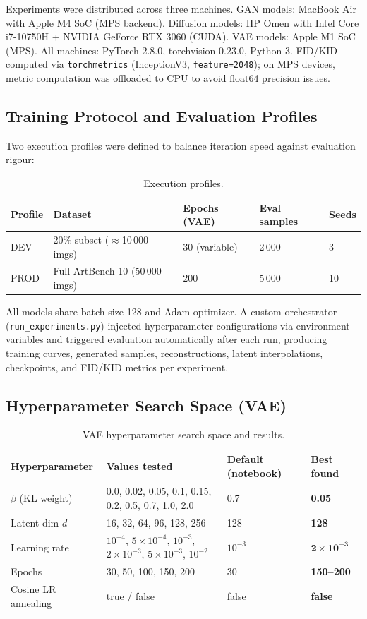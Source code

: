 \documentclass[runningheads]{llncs}
\begin{document}
Experiments were distributed across three machines. GAN models: MacBook Air with Apple M4 SoC (MPS backend). Diffusion models: HP Omen with Intel Core i7-10750H + NVIDIA GeForce RTX 3060 (CUDA). VAE models: Apple M1 SoC (MPS). All machines: PyTorch 2.8.0, torchvision 0.23.0, Python 3. FID/KID computed via \texttt{torchmetrics} (InceptionV3, \texttt{feature=2048}); on MPS devices, metric computation was offloaded to CPU to avoid float64 precision issues.

\subsection{Training Protocol and Evaluation Profiles}

Two execution profiles were defined to balance iteration speed against evaluation rigour:

\begin{table}[htbp]
\caption{Execution profiles.}\label{tab:profiles}
\centering
\begin{tabular}{lllll}
\toprule
Profile & Dataset & Epochs (VAE) & Eval samples & Seeds \\
\midrule
DEV  & 20\% subset ($\approx$10\,000 imgs) & 30 (variable) & 2\,000 & 3 \\
PROD & Full ArtBench-10 (50\,000 imgs)    & 200           & 5\,000 & 10 \\
\bottomrule
\end{tabular}
\end{table}

All models share batch size 128 and Adam optimizer. A custom orchestrator (\texttt{run\_experiments.py}) injected hyperparameter configurations via environment variables and triggered evaluation automatically after each run, producing training curves, generated samples, reconstructions, latent interpolations, checkpoints, and FID/KID metrics per experiment.

\subsection{Hyperparameter Search Space (VAE)}

\begin{table}[htbp]
\caption{VAE hyperparameter search space and results.}\label{tab:vae_search}
\centering
\begin{tabular}{llll}
\toprule
Hyperparameter & Values tested & Default (notebook) & Best found \\
\midrule
$\beta$ (KL weight) & 0.0, 0.02, 0.05, 0.1, 0.15, 0.2, 0.5, 0.7, 1.0, 2.0 & 0.7 & \textbf{0.05} \\
Latent dim $d$ & 16, 32, 64, 96, 128, 256 & 128 & \textbf{128} \\
Learning rate & $10^{-4}$, $5{\times}10^{-4}$, $10^{-3}$, $2{\times}10^{-3}$, $5{\times}10^{-3}$, $10^{-2}$ & $10^{-3}$ & $\mathbf{2{\times}10^{-3}}$ \\
Epochs & 30, 50, 100, 150, 200 & 30 & \textbf{150--200} \\
Cosine LR annealing & true / false & false & \textbf{false} \\
\bottomrule
\end{tabular}
\end{table}
\end{document}
